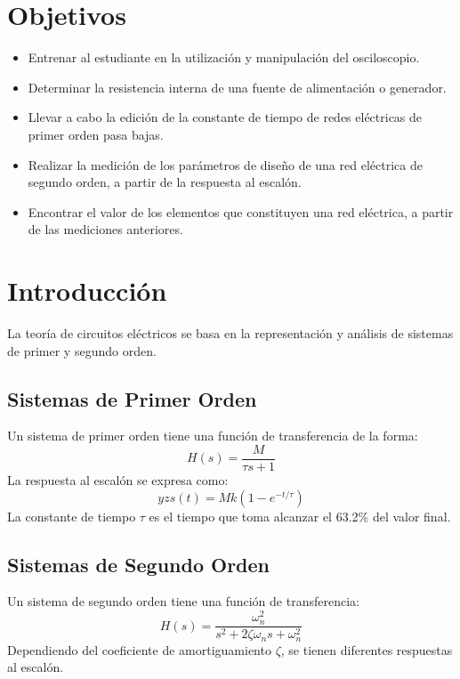 \documentclass[10pt,openany]{book}
\begin{document}


\tableofcontents

\newpage
\section*{Objetivos}
\begin{itemize}
    \item Entrenar al estudiante en la utilización y manipulación del osciloscopio. 
    \item Determinar la resistencia interna de una fuente de alimentación o generador. 
    \item Llevar a cabo la edición de la constante de tiempo de redes eléctricas de primer orden pasa bajas.
    \item Realizar la medición de los parámetros de diseño de una red eléctrica de segundo orden, a partir de la respuesta al escalón.
    \item Encontrar el valor de los elementos que constituyen una red eléctrica, a partir de las mediciones anteriores.
\end{itemize}

\section*{Introducción}
La teoría de circuitos eléctricos se basa en la representación y análisis de sistemas de primer y segundo orden. 

\subsection*{Sistemas de Primer Orden}
Un sistema de primer orden tiene una función de transferencia de la forma:
\begin{equation}
    H(s) = \frac{M}{\tau s + 1}
\end{equation}
La respuesta al escalón se expresa como:
\begin{equation}
    yzs(t) = M k \left(1 - e^{-t/\tau} \right)
\end{equation}
La constante de tiempo $\tau$ es el tiempo que toma alcanzar el 63.2\% del valor final.

\subsection*{Sistemas de Segundo Orden}
Un sistema de segundo orden tiene una función de transferencia:
\begin{equation}
    H(s) = \frac{\omega_n^2}{s^2 + 2\zeta \omega_n s + \omega_n^2}
\end{equation}
Dependiendo del coeficiente de amortiguamiento $\zeta$, se tienen diferentes respuestas al escalón.
\end{document}
